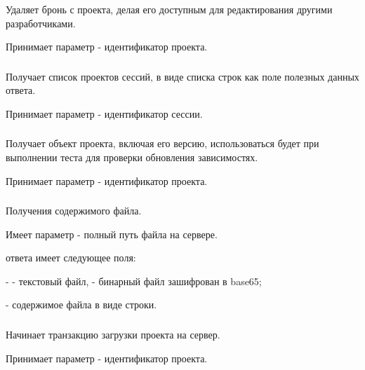 Удаляет бронь с проекта, делая его доступным для редактирования другими разработчиками.

Принимает параметр  - идентификатор проекта.

\subsubsection{}

Получает список проектов сессий, в виде списка строк как поле  полезных данных ответа.

Принимает параметр  - идентификатор сессии.

\subsubsection{}

Получает объект проекта, включая его версию, использоваться будет при выполнении теста для проверки обновления зависимостях.

Принимает параметр  - идентификатор проекта.

\subsubsection{}

Получения содержимого файла.

Имеет параметр  - полный путь файла на сервере.
 
 ответа имеет следующее поля:

\begin{icItems}
	\item {} -  - текстовый файл,  - бинарный файл зашифрован в base65;
	\item {} - содержимое файла в виде строки.
\end{icItems}

\subsubsection{}

Начинает транзакцию загрузки проекта на сервер.

Принимает параметр  - идентификатор проекта.

\subsubsection{}

